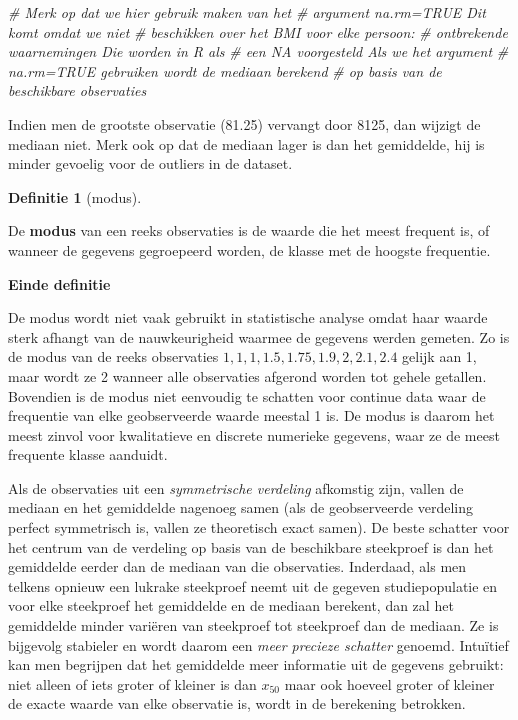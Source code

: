 \documentclass[
  12pt,dutch]{book}
\newenvironment{Shaded}{\begin{snugshade}}{\end{snugshade}}
\newcommand{\CommentTok}[1]{\textcolor[rgb]{0.56,0.35,0.01}{\textit{#1}}}
\theoremstyle{definition}
\newtheorem{definition}{Definitie}[chapter]
\theoremstyle{definition}
\theoremstyle{definition}
\theoremstyle{definition}
\theoremstyle{remark}
\begin{document}
\begin{Shaded}
\begin{Highlighting}[]
\CommentTok{\# Merk op dat we hier gebruik maken van het}
\CommentTok{\# argument na.rm=TRUE Dit komt omdat we niet}
\CommentTok{\# beschikken over het BMI voor elke persoon:}
\CommentTok{\# ontbrekende waarnemingen Die worden in R als}
\CommentTok{\# een NA voorgesteld Als we het argument}
\CommentTok{\# na.rm=TRUE gebruiken wordt de mediaan berekend}
\CommentTok{\# op basis van de beschikbare observaties}
\end{Highlighting}
\end{Shaded}

Indien men de grootste observatie (81.25) vervangt door 8125, dan wijzigt de mediaan niet.
Merk ook op dat de mediaan lager is dan het gemiddelde, hij is minder gevoelig voor de outliers in de dataset.

\begin{definition}[modus]
\protect\hypertarget{def:unnamed-chunk-97}{}\label{def:unnamed-chunk-97}~
\end{definition}

De \textbf{modus} van een reeks observaties is de waarde die het meest
frequent is, of wanneer de gegevens gegroepeerd worden, de klasse met de
hoogste frequentie.

\textbf{Einde definitie}

De modus wordt niet vaak gebruikt in statistische analyse omdat haar waarde
sterk afhangt van de nauwkeurigheid waarmee de gegevens werden gemeten. Zo
is de modus van de reeks observaties \(1, 1, 1, 1.5, 1.75, 1.9, 2, 2.1, 2.4\)
gelijk aan 1, maar wordt ze 2 wanneer alle observaties afgerond worden tot
gehele getallen. Bovendien is de modus niet eenvoudig te schatten voor
continue data waar de frequentie van elke geobserveerde waarde meestal 1 is.
De modus is daarom het meest zinvol voor kwalitatieve en discrete numerieke
gegevens, waar ze de meest frequente klasse aanduidt.

Als de observaties uit een \emph{symmetrische verdeling} afkomstig zijn,
vallen de mediaan en het gemiddelde nagenoeg samen (als de geobserveerde
verdeling perfect symmetrisch is, vallen ze theoretisch exact samen).
De beste schatter voor het centrum van de verdeling op basis van de beschikbare
steekproef is dan het gemiddelde eerder dan de mediaan van die observaties.
Inderdaad, als men telkens opnieuw een lukrake steekproef neemt uit de
gegeven studiepopulatie en voor elke steekproef het gemiddelde en de mediaan
berekent, dan zal het gemiddelde minder variëren van steekproef tot
steekproef dan de mediaan. Ze is bijgevolg stabieler en wordt daarom een
\emph{meer precieze schatter} genoemd. Intuïtief kan men begrijpen dat
het gemiddelde meer informatie uit de gegevens gebruikt: niet alleen of iets
groter of kleiner is dan \(x_{50}\) maar ook hoeveel groter of kleiner de
exacte waarde van elke observatie is, wordt in de berekening betrokken.
\end{document}

